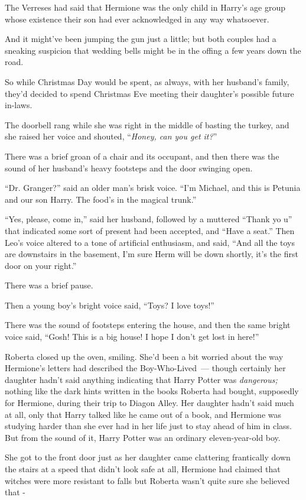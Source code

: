 The Verreses had said that Hermione was the only child in Harry's age group whose existence their son had ever acknowledged in any way whatsoever.

And it might've been jumping the gun just a little; but both couples had a sneaking suspicion that wedding bells might be in the offing a few years down the road.

So while Christmas Day would be spent, as always, with her husband's family, they'd decided to spend Christmas Eve meeting their daughter's possible future in-laws.

The doorbell rang while she was right in the middle of basting the turkey, and she raised her voice and shouted, ``\emph{Honey, can you get it?}''

There was a brief groan of a chair and its occupant, and then there was the sound of her husband's heavy footsteps and the door swinging open.

``Dr. Granger?'' said an older man's brisk voice. ``I'm Michael, and this is Petunia and our son Harry. The food's in the magical trunk.''

``Yes, please, come in,'' said her husband, followed by a muttered ``Thank yo u'' that indicated some sort of present had been accepted, and ``Have a seat.'' Then Leo's voice altered to a tone of artificial enthusiasm, and said, ``And all the toys are downstairs in the basement, I'm sure Herm will be down shortly, it's the first door on your right.''

There was a brief pause.

Then a young boy's bright voice said, ``Toys? I love toys!''

There was the sound of footsteps entering the house, and then the same bright voice said, ``Gosh! This is a big house! I hope I don't get lost in here!''

Roberta closed up the oven, smiling. She'd been a bit worried about the way Hermione's letters had described the Boy-Who-Lived~--- though certainly her daughter hadn't said anything indicating that Harry Potter was \emph{dangerous;} nothing like the dark hints written in the books Roberta had bought, supposedly for Hermione, during their trip to Diagon Alley. Her daughter hadn't said much at all, only that Harry talked like he came out of a book, and Hermione was studying harder than she ever had in her life just to stay ahead of him in class. But from the sound of it, Harry Potter was an ordinary eleven-year-old boy.

She got to the front door just as her daughter came clattering frantically down the stairs at a speed that didn't look safe at all, Hermione had claimed that witches were more resistant to falls but Roberta wasn't quite sure she believed that -

